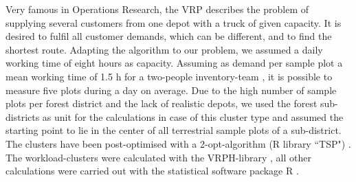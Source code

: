Very famous in Operations Research, the VRP describes the problem of supplying several customers from one depot with a truck of given capacity. It is desired to fulfil all customer demands, which can be different, and to find the shortest route. Adapting the algorithm to our problem, we assumed a daily working time of eight hours as capacity. Assuming as demand per sample plot a mean working time of 1.5 h for a two-people inventory-team \citep{Zinggeler_1997,Zinggeler_2001}, it is possible to measure five plots during a day on average. Due to the high number of sample 
plots per forest district and the lack of realistic depots, we used the forest sub-districts as unit for the calculations in case of this cluster type and assumed the starting point to lie in the center of all terrestrial sample plots of a sub-district. The clusters have been post-optimised with a 2-opt-algorithm (R library ``TSP") \citep{Hahsler_2007}. The workload-clusters were calculated with the VRPH-library \citep{Groeer_2010}, all other calculations were carried out with the statistical software package R \citep{R_Doc}.

